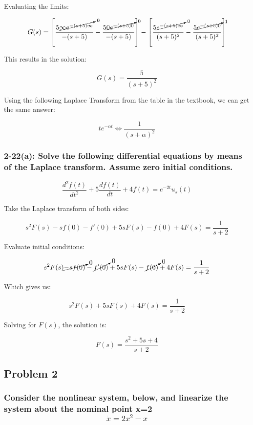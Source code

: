 \documentclass[12pt, letterpaper]{../assignment}
\begin{document}
Evaluating the limits:

$$ G(s) = \left[\frac{ 5 \cancelto{0}{\infty e^{-( s + 5 )\infty}}}{-( s + 5 )}-\frac{ 5 \cancelto{0}{0 e^{-( s + 5 )0}}}{-( s + 5 )}\right]
 - \left[\frac{5 \cancelto{0}{e^{-( s + 5 )\infty}}}{( s + 5 )^2} - \frac{5 \cancelto{1}{e^{-( s + 5 )0}}}{( s + 5 )^2} \right] $$

This results in the solution:

\begin{answer}
$$ G(s) = \frac{5}{( s + 5 )^2}$$
\end{answer}

Using the following Laplace Transform from the table in the textbook, we can get the same answer:

$$ t e^{-\alpha t} \Leftrightarrow \frac{1}{(s+\alpha)^2} $$

\subsubsection*{2-22(a): Solve the following differential equations by means of the Laplace transform.
Assume zero initial conditions.}

$$ \frac{d^2 f(t)}{d t^2} + 5\frac{d f(t)}{d t} + 4 f(t) = e^{-2t} u_s(t) $$

Take the Laplace transform of both sides:

$$ s^2 F(s) - s f(0) - f'(0) + 5s F(s) - f(0)  + 4 F(s) =  \frac{1}{s+2} $$

Evaluate initial conditions:

$$ s^2 F(s) \cancelto{0}{- s f(0)} - \cancelto{0}{f'(0)} + 5s F(s) - \cancelto{0}{f(0)}  + 4 F(s) =  \frac{1}{s+2} $$

Which gives us:

$$ s^2 F(s) + 5s F(s)  + 4 F(s) =  \frac{1}{s+2} $$

Solving for $F(s)$, the solution is:

\begin{answer}
$$ F(s) =  \frac{s^2 + 5s + 4}{s+2} $$
\end{answer}

\subsection*{Problem 2}
\subsubsection*{Consider the nonlinear system, below, and linearize the system about the nominal point x=2
$$ \dot{x} = 2 x^2 - x $$ }
\end{document}
